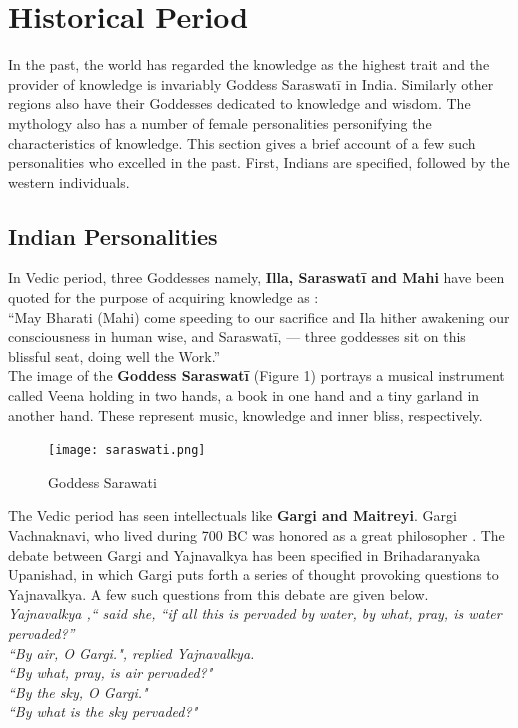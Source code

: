\documentclass[a4paper,10pt]{article}
\begin{document}
\section{Historical Period}
\label{sec:History}
In the past, the world has regarded the knowledge as the highest trait and the provider of knowledge is invariably Goddess Saraswat\={i} in India. Similarly other regions also have their Goddesses dedicated to knowledge and wisdom. The mythology also has a number of female personalities personifying the characteristics of knowledge. This section gives a brief account of a few such personalities who excelled in the past. First, Indians are specified, followed by the western individuals. 

\subsection{Indian Personalities}
In Vedic period, three Goddesses namely, \textbf{Illa, Saraswat\={i} and Mahi} have been quoted for the purpose of acquiring knowledge as \cite{saras}: \\
“May Bharati (Mahi) come speeding to our sacrifice and Ila hither awakening our consciousness in human wise, and Saraswat\={i}, — three goddesses sit on this blissful seat, doing well the Work.” \\

The image of the \textbf{Goddess Saraswat\={i}} (Figure 1) portrays a musical instrument called Veena holding in  two hands, a book in one hand and a tiny garland in another hand. These represent music, knowledge and inner bliss, respectively. 
\begin{center}
\begin{figure}[h]
\centering
 \texttt{[image: saraswati.png]}
 \caption{Goddess Sarawati}
\end{figure}
\end{center}

The Vedic period has seen intellectuals like \textbf{Gargi and Maitreyi}. Gargi Vachnaknavi, who lived during 700 BC was honored as a great philosopher \cite{Gargi}. The debate between Gargi and Yajnavalkya has been specified in Brihadaranyaka Upanishad, in which Gargi puts forth a series of thought provoking questions to Yajnavalkya. A few such questions from this debate are given below. \\

\textit{Yajnavalkya ,`` said she, ``if all this is pervaded by water, by  what, pray, is water pervaded?''} \\
\textit{``By air, O Gargi.", replied Yajnavalkya.} \\
\textit{``By what, pray, is air pervaded?" }\\
\textit{``By the sky, O Gargi."} \\
\textit{``By what is the sky pervaded?"}  \\
\end{document}
